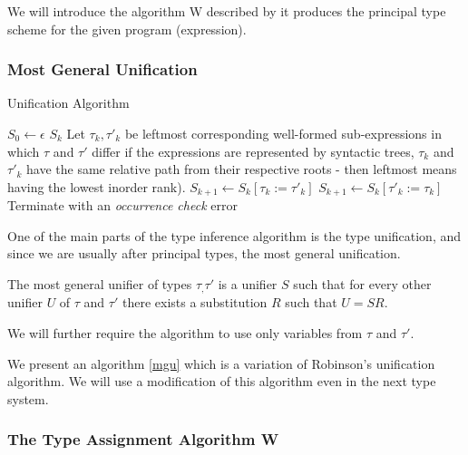 We will introduce the algorithm W described by %
it produces the principal type scheme for the given program (expression).

\subsubsection{Most General Unification}

\begin{algorithm}[t]
\caption{Unification Algorithm}
\label{mgu}
\begin{algorithmic}[1]
    \State $S_0 \gets \epsilon$
        \Return $S_k$
    \EndIf
    \State Let $\tau_k, \tau'_k$ be leftmost corresponding well-formed sub-expressions in which $\tau$ and $\tau'$ differ \Comment if the expressions are represented by syntactic trees, $\tau_k$ and $\tau'_k$ have the same relative path from their respective roots - then leftmost means having the lowest inorder rank).
        \State $S_{k+1} \gets S_k [\tau_k := \tau'_k]$
        \State $S_{k+1} \gets S_k [\tau'_k := \tau_k]$
    \Else
        \State Terminate with an \textit{occurrence check} error
    \EndIf
    \EndFor
\EndFunction
\end{algorithmic}
\end{algorithm}

One of the main parts of the type inference algorithm is the type unification, and since we are usually after principal types, the most general unification.

The most general unifier of types $\tau_, \tau'$ is a unifier $S$ such that for every other unifier $U$ of $\tau$ and $\tau'$ there exists a substitution $R$ such that $U = S R$. %

We will further require the algorithm to use only variables from $\tau$ and $\tau'$.

We present an algorithm \ref{mgu} which is a variation of Robinson's unification algorithm. We will use a modification of this algorithm even in the next type system. %

\subsubsection{The Type Assignment Algorithm W}

